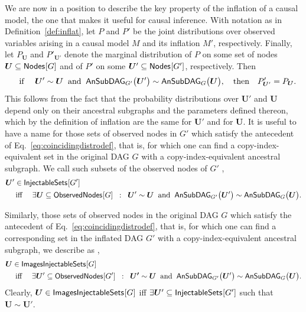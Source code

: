 We are now in a position to describe the key property of the inflation of a causal model, the one that makes it useful for causal inference. With notation as in Definition~\ref{def:inflat}, let $P$ and $P'$ be the joint distributions over observed variables arising in a causal model $M$ and its inflation $M'$, respectively.  Finally, let $P_{\bm{U}}$ and $P'_{\bm{U}'}$ denote the marginal distribution of $P$ on some set of nodes $\bm{U}\subseteq\nodes{G}$ and of $P'$ on some $\bm{U}'\subseteq\nodes{G'}$, respectively. Then
\begin{align}\label{eq:coincidingdistrodef}
\quad\text{if }\quad \bm{U}'\sim \bm{U} \;\;\text{and}\;\; \ansubgraph[G']{\bm{U}'}\sim\ansubgraph[G]{\bm{U}}, \quad\text{then}\quad P'_{\bm{U}'}=P_{\bm{U}}.
\end{align}
This follows from the fact that the probability distributions over $\bm{U}'$ and $\bm{U}$ depend only on their ancestral subgraphs and the parameters defined thereon, which by the definition of inflation are the same for $\bm{U}'$ and for $\bm{U}$.
It is useful to have a name for those sets of observed nodes in $G'$ which satisfy the antecedent of Eq.~\eqref{eq:coincidingdistrodef}, that is, for which one can find a copy-index-equivalent set in the original DAG $G$ with a copy-index-equivalent ancestral subgraph.  We call such subsets of the observed nodes of $G'$ ,
\begin{align}\begin{split}\label{eq:definjectable}
&\bm{U}'\in\SmallNamedFunction{InjectableSets}{G'} \\
&\quad\text{ iff }\quad \exists \bm{U}\subseteq \SmallNamedFunction{ObservedNodes}{G} \;\; :\;\; \bm{U}'\sim\bm{U} \;\;\text{and}\;\; \ansubgraph[G']{\bm{U}'}\sim\ansubgraph[G]{\bm{U}}.
\end{split}\end{align}

Similarly,  those sets of observed nodes in the original DAG $G$ which satisfy the antecedent of Eq.~\eqref{eq:coincidingdistrodef}, that is, for which one can find a corresponding set in the inflated DAG $G'$ with a copy-index-equivalent ancestral subgraph, we describe as ,
\begin{align}\begin{split}\label{eq:defimageinjectable}
& \bm{U}\in\SmallNamedFunction{ImagesInjectableSets}{G} \\
& \quad\text{ iff }\quad \exists \bm{U}' \subseteq \SmallNamedFunction{ObservedNodes}{G'} \;\; :\;\; \bm{U'}\sim\bm{U} \;\;\text{and}\;\; \ansubgraph[G']{\bm{U}'}\sim\ansubgraph[G]{\bm{U}}.
\end{split}\end{align}
Clearly, $\bm{U}\in\SmallNamedFunction{ImagesInjectableSets}{G}$ iff $\exists \bm{U}' \subseteq \SmallNamedFunction{InjectableSets}{G'}$ such that $\bm{U}\sim \bm{U}'$.


